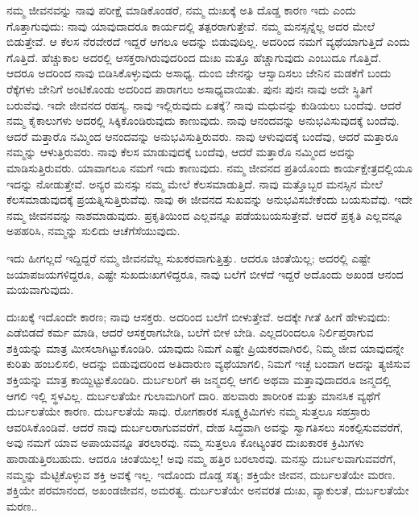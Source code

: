 ನಮ್ಮ ಜೀವನವನ್ನು ನಾವು ಪರೀಕ್ಷೆ ಮಾಡಿಕೊಂಡರೆ, ನಮ್ಮ ದುಃಖಕ್ಕೆ ಅತಿ ದೊಡ್ಡ ಕಾರಣ ಇದು ಎಂದು ಗೊತ್ತಾಗುವುದು: ನಾವು ಯಾವುದಾದರೂ ಕಾರ್ಯದಲ್ಲಿ ತತ್ಪರರಾಗುತ್ತೇವೆ. ನಮ್ಮ ಮನಸ್ಸನ್ನೆಲ್ಲ ಅದರ ಮೇಲೆ ಬಿಡುತ್ತೇವೆ. ಆ ಕೆಲಸ ನೆರವೇರದೆ ಇದ್ದರೆ ಆಗಲೂ ಅದನ್ನು ಬಿಡುವುದಿಲ್ಲ. ಅದರಿಂದ ನಮಗೆ ವ್ಯಥೆಯಾಗುತ್ತಿದೆ ಎಂದು ಗೊತ್ತಿದೆ. ಹೆಚ್ಚುಕಾಲ ಅದರಲ್ಲಿ ಆಸಕ್ತರಾಗಿರುವುದರಿಂದ ದುಃಖ ಮತ್ತೂ ಹೆಚ್ಚಾಗುವುದು ಎಂಬುದೂ ಗೊತ್ತಿದೆ. ಆದರೂ ಅದರಿಂದ ನಾವು ಬಿಡಿಸಿಕೊಳ್ಳುವುದು ಅಸಾಧ್ಯ. ದುಂಬಿ ಜೇನನ್ನು ಆಸ್ವಾದಿಸಲು ಜೇನಿನ ಮಡಕೆಗೆ ಬಂದು ರೆಕ್ಕೆಗಳು ಜೇನಿಗೆ ಅಂಟಿಕೊಂಡು ಅದರಿಂದ ಪಾರಾಗಲು ಅಸಾಧ್ಯವಾಯಿತು. ಪುನಃ ಪುನಃ ನಾವು ಅದೇ ಸ್ಥಿತಿಗೆ ಬರುವೆವು. ಇದೇ ಜೀವನದ ರಹಸ್ಯ. ನಾವು ಇಲ್ಲಿರುವುದು ಏತಕ್ಕೆ? ನಾವು ಮಧುವನ್ನು ಕುಡಿಯಲು ಬಂದೆವು. ಆದರೆ ನಮ್ಮ ಕೈಕಾಲುಗಳು ಅದರಲ್ಲಿ ಸಿಕ್ಕಿಕೊಂಡಿರುವುದು ಕಾಣುವುದು. ನಾವು ಆನಂದವನ್ನು ಅನುಭವಿಸುವುದಕ್ಕೆ ಬಂದೆವು. ಆದರೆ ಮತ್ತಾರೊ ನಮ್ಮಿಂದ ಆನಂದವನ್ನು ಅನುಭವಿಸುತ್ತಿರುವರು. ನಾವು ಆಳುವುದಕ್ಕೆ ಬಂದೆವು, ಆದರೆ ಮತ್ತಾರೂ ನಮ್ಮನ್ನು ಆಳುತ್ತಿರುವರು. ನಾವು ಕೆಲಸ ಮಾಡುವುದಕ್ಕೆ ಬಂದೆವು, ಆದರೆ ಮತ್ತಾರೊ ನಮ್ಮಿಂದ ಅದನ್ನು ಮಾಡಿಸುತ್ತಿರುವರು. ಯಾವಾಗಲೂ ನಮಗೆ ಇದು ಕಾಣುವುದು. ನಮ್ಮ ಜೀವನದ ಪ್ರತಿಯೊಂದು ಕಾರ್ಯಕ್ಷೇತ್ರದಲ್ಲಿಯೂ ಇದನ್ನು ನೋಡುತ್ತೇವೆ. ಅನ್ಯರ ಮನಸ್ಸು ನಮ್ಮ ಮೇಲೆ ಕೆಲಸಮಾಡುತ್ತಿದೆ. ನಾವು ಮತ್ತೊಬ್ಬರ ಮನಸ್ಸಿನ ಮೇಲೆ ಕೆಲಸಮಾಡುವುದಕ್ಕೆ ಪ್ರಯತ್ನಿಸುತ್ತಿರುವೆವು. ನಾವು ಈ ಜೀವನದ ಸುಖವನ್ನು ಅನುಭವಿಸಬೇಕೆಂದು ಬಯಸುವೆವು. ಇದೇ ನಮ್ಮ ಜೀವನವನ್ನು ನಾಶಮಾಡುವುದು. ಪ್ರಕೃತಿಯಿಂದ ಎಲ್ಲವನ್ನೂ ಪಡೆಯಬಯಸುತ್ತೇವೆ. ಆದರೆ ಪ್ರಕೃತಿ ಎಲ್ಲವನ್ನೂ ಅಪಹರಿಸಿ, ನಮ್ಮನ್ನು ಸುಲಿದು ಆಚೆಗೆಸೆಯುವುದು.

ಇದು ಹೀಗಲ್ಲದೆ ಇದ್ದಿದ್ದರೆ ನಮ್ಮ ಜೀವನವೆಲ್ಲ ಸುಖಕರವಾಗುತ್ತಿತ್ತು. ಆದರೂ ಚಿಂತೆಯಿಲ್ಲ; ಅದರಲ್ಲಿ ಎಷ್ಟೇ ಜಯಾಪಜಯಗಳಿದ್ದರೂ, ಎಷ್ಟೇ ಸುಖದುಃಖಗಳಿದ್ದರೂ, ನಾವು ಬಲೆಗೆ ಬೀಳದೆ ಇದ್ದರೆ ಅದೊಂದು ಅಖಂಡ ಆನಂದ ಮಯವಾಗುವುದು.

ದುಃಖಕ್ಕೆ ಇದೊಂದೇ ಕಾರಣ; ನಾವು ಆಸಕ್ತರು. ಅದರಿಂದ ಬಲೆಗೆ ಬೀಳುತ್ತೇವೆ. ಅದಕ್ಕೇ ಗೀತೆ ಹೀಗೆ ಹೇಳುವುದು: ಎಡೆಬಿಡದೆ ಕರ್ಮ ಮಾಡಿ, ಆದರೆ ಆಸಕ್ತರಾಗಬೇಡಿ, ಬಲೆಗೆ ಬೀಳ ಬೇಡಿ. ಎಲ್ಲದರಿಂದಲೂ ನಿರ್ಲಿಪ್ತರಾಗುವ ಶಕ್ತಿಯನ್ನು ಮಾತ್ರ ಮೀಸಲಾಗಿಟ್ಟುಕೊಂಡಿರಿ. ಯಾವುದು ನಿಮಗೆ ಎಷ್ಟೇ ಪ್ರಿಯಕರವಾಗಿರಲಿ, ನಿಮ್ಮ ಜೀವ ಯಾವುದನ್ನೇ ಕುರಿತು ಹಂಬಲಿಸಲಿ, ಅದನ್ನು ಬಿಡುವುದರಿಂದ ಅತಿದಾರುಣ ವ್ಯಥೆಯಾಗಲಿ, ನಿಮಗೆ ಇಚ್ಛೆ ಬಂದಾಗ ಅದನ್ನು ತ್ಯಜಿಸುವ ಶಕ್ತಿಯನ್ನು ಮಾತ್ರ ಕಾಯ್ದಿಟ್ಟುಕೊಂಡಿರಿ. ದುರ್ಬಲರಿಗೆ ಈ ಜನ್ಮದಲ್ಲಿ ಆಗಲಿ ಅಥವಾ ಮತ್ತಾವುದಾದರೂ ಜನ್ಮದಲ್ಲಿ ಆಗಲಿ ಇಲ್ಲಿ ಸ್ಥಳವಿಲ್ಲ. ದುರ್ಬಲತೆಯೇ ಗುಲಾಮಗಿರಿಗೆ ದಾರಿ. ಹಲವಾರು ಶಾರೀರಿಕ ಮತ್ತು ಮಾನಸಿಕ ವ್ಯಥೆಗೆ ದುರ್ಬಲತೆಯೇ ಕಾರಣ. ದುರ್ಬಲತೆಯೆ ಸಾವು. ರೋಗಕಾರಕ ಸೂಕ್ಷ್ಮಕ್ರಿಮಿಗಳು ನಮ್ಮ ಸುತ್ತಲೂ ಸಹಸ್ರಾರು ಆವರಿಸಿಕೊಂಡಿವೆ. ಆದರೆ ನಾವು ದುರ್ಬಲರಾಗುವವರೆಗೆ, ದೇಹ ಸಿದ್ಧವಾಗಿ ಅವನ್ನು ಸ್ವಾಗತಿಸಲು ಸಂಕಲ್ಪಿಸುವವರೆಗೆ, ಅವು ನಮಗೆ ಯಾವ ಅಪಾಯವನ್ನೂ ತರಲಾರವು. ನಮ್ಮ ಸುತ್ತಲೂ ಕೋಟ್ಯಂತರ ದುಃಖಕಾರಕ ಕ್ರಿಮಿಗಳು ಹಾರಾಡುತ್ತಿರಬಹುದು. ಆದರೂ ಚಿಂತೆಯಿಲ್ಲ! ಅವು ನಮ್ಮ ಹತ್ತಿರ ಬರಲಾರವು. ಮನಸ್ಸು ದುರ್ಬಲವಾಗುವವರೆಗೆ, ನಮ್ಮನ್ನು ಮೆಟ್ಟಿಕೊಳ್ಳುವ ಶಕ್ತಿ ಅವಕ್ಕೆ ಇಲ್ಲ. ಇದೊಂದು ದೊಡ್ಡ ಸತ್ಯ; ಶಕ್ತಿಯೇ ಜೀವನ, ದುರ್ಬಲತೆಯೇ ಮರಣ. ಶಕ್ತಿಯೇ ಪರಮಾನಂದ, ಅಖಂಡಜೀವನ, ಅಮರತ್ವ. ದುರ್ಬಲತೆಯೇ ಅನವರತ ದುಃಖ, ವ್ಯಾಕುಲತೆ, ದುರ್ಬಲತೆಯೇ ಮರಣ..

